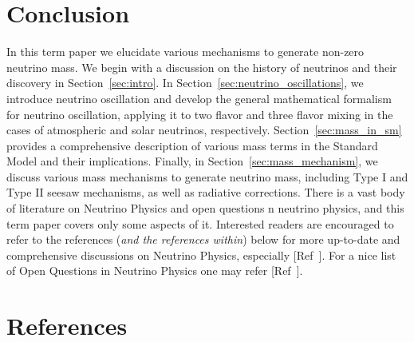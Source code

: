 \documentclass[%
aapm,
 rmp,
 amsmath,amssymb,
 reprint,%
]{revtex4-2}
\begin{document}
\section{Conclusion}
In this term paper we elucidate various mechanisms to generate non-zero neutrino mass. We begin with a discussion on the history of neutrinos and their discovery in Section~\ref{sec:intro}. In Section~\ref{sec:neutrino_oscillations}, we introduce neutrino oscillation and develop the general mathematical formalism for neutrino oscillation, applying it to two flavor and three flavor mixing in the cases of atmospheric and solar neutrinos, respectively. Section~\ref{sec:mass_in_sm} provides a comprehensive description of various mass terms in the Standard Model and their implications. Finally, in Section~\ref{sec:mass_mechanism}, we discuss various mass mechanisms to generate neutrino mass, including Type I and Type II seesaw mechanisms, as well as radiative corrections. There is a vast body of literature on Neutrino Physics and open questions n neutrino physics, and this term paper covers only some aspects of it. Interested readers are encouraged to refer to the references (\textit{and the references within}) below for more up-to-date and comprehensive discussions on Neutrino Physics, especially [Ref~]. For a nice list of Open Questions in Neutrino Physics one may refer [Ref~]. 


\section*{References}
\onecolumngrid
\appendix

\end{document}
